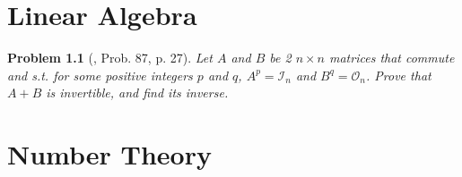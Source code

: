 \documentclass[oneside]{book}
\numberwithin{equation}{section}
\newtheorem{problem}{Problem}[section]
\begin{document}
















\chapter{Linear Algebra}

\begin{problem}[\cite{Gelca_Andreescu2017}, Prob. 87, p. 27]
	Let $A$ and $B$ be 2 $n\times n$ matrices that commute and s.t. for some positive integers $p$ and $q$, $A^p = \mathcal{I}_n$ and $B^q = \mathcal{O}_n$. Prove that $A + B$ is invertible, and find its inverse.
\end{problem}


\chapter{Number Theory}
\end{document}
